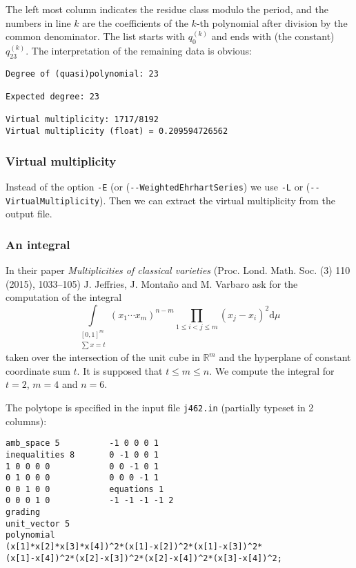 \documentclass[12pt,a4paper]{scrartcl}
\theoremstyle{definition}
\def\RR{{\mathbb R}}
\def\ttt{\texttt}
\begin{document}
{The left most column indicates the residue class modulo the period, and the
numbers in line $k$ are the coefficients of the $k$-th polynomial after
division by the common denominator. The list starts with $q_0^{(k)}$ and ends
with (the constant) $q_{23}^{(k)}$.
The interpretation of the remaining data is obvious:

\begin{Verbatim}
Degree of (quasi)polynomial: 23

Expected degree: 23

Virtual multiplicity: 1717/8192
Virtual multiplicity (float) = 0.209594726562
\end{Verbatim}


\subsubsection{Virtual multiplicity}

Instead of the option \verb|-E| (or (\verb|--WeightedEhrhartSeries|) we use \verb|-L| or (\verb|--VirtualMultiplicity|). Then we can extract the virtual multiplicity from the output file.

\subsubsection{An integral}
In their paper \emph{Multiplicities of classical varieties} (Proc. Lond. Math. Soc. (3) 110 (2015), 1033--105) J. Jeffries, J. Monta\~no and M. Varbaro ask
for the computation of the integral
$$
\int\limits_{\substack{[0,1]^m \\ \sum{x}= t}}(x_1\cdots x_{m})^{n-m}\prod_{1\le i<j \le m}(x_j-x_i)^2 \mathrm d{\mu}\
$$
taken over the intersection of the unit cube in $\RR^m$ and the hyperplane of constant coordinate sum $t$. It is supposed that $t\le m \le n$. We compute the integral for $t=2$, $m=4$ and $n=6$.

The polytope is specified in the input file \ttt{j462.in} (partially typeset in 2
columns):

\begin{Verbatim}
amb_space 5          -1 0 0 0 1   
inequalities 8       0 -1 0 0 1   
1 0 0 0 0            0 0 -1 0 1   
0 1 0 0 0            0 0 0 -1 1   
0 0 1 0 0            equations 1  
0 0 0 1 0            -1 -1 -1 -1 2
grading
unit_vector 5
polynomial
(x[1]*x[2]*x[3]*x[4])^2*(x[1]-x[2])^2*(x[1]-x[3])^2*
(x[1]-x[4])^2*(x[2]-x[3])^2*(x[2]-x[4])^2*(x[3]-x[4])^2;
\end{Verbatim}

}
\end{document}
